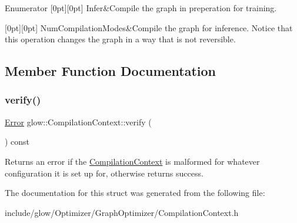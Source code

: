 \begin{DoxyEnumFields}{Enumerator}
[0pt][0pt]{}\mbox{\label{structglow_1_1_compilation_context_a92efb87746c0edf7756b84fdcd87014aa442b0d534b230e2f2c9b562974652f79}} 
Infer&Compile the graph in preperation for training. \\
\hline

[0pt][0pt]{}\mbox{\label{structglow_1_1_compilation_context_a92efb87746c0edf7756b84fdcd87014aa9fd1bb83eed98173b7291341f46dce86}} 
Num\+Compilation\+Modes&Compile the graph for inference. Notice that this operation changes the graph in a way that is not reversible. \\
\hline

\end{DoxyEnumFields}


\subsection{Member Function Documentation}
\mbox{\label{structglow_1_1_compilation_context_a636e4b05d0dce25f559262c31ac8f0a9}} 
\subsubsection{\texorpdfstring{verify()}{verify()}}
{\footnotesize\ttfamily \hyperlink{namespaceglow_afdb176c3a672ef66db0ecfc19a8d39bf}{Error} glow\+::\+Compilation\+Context\+::verify (\begin{DoxyParamCaption}{ }\end{DoxyParamCaption}) const\hspace{0.3cm}{\ttfamily [inline]}}

\begin{DoxyReturn}{Returns}
an error if the \hyperlink{structglow_1_1_compilation_context}{Compilation\+Context} is malformed for whatever configuration it is set up for, otherwise returns success. 
\end{DoxyReturn}


The documentation for this struct was generated from the following file\+:\begin{DoxyCompactItemize}
\item 
include/glow/\+Optimizer/\+Graph\+Optimizer/Compilation\+Context.\+h\end{DoxyCompactItemize}
